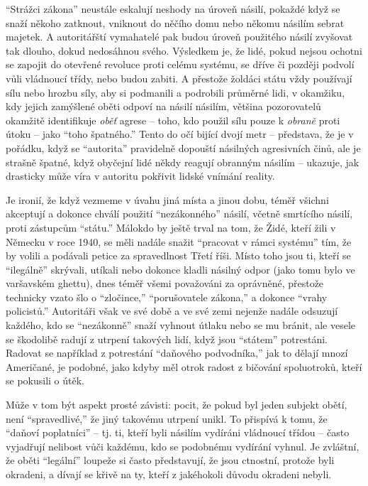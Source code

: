 \documentclass{book}
\begin{document}
\enquote{Strážci zákona} neustále eskalují neshody na úroveň násilí, pokaždé když se snaží někoho zatknout, vniknout do něčího domu nebo někomu násilím sebrat majetek. A autoritářští vymahatelé pak budou úroveň použitého násilí zvyšovat tak dlouho, dokud nedosáhnou svého. Výsledkem je, že lidé, pokud nejsou ochotni se zapojit do otevřené revoluce proti celému systému, se dříve či později podvolí vůli vládnoucí třídy, nebo budou zabiti. A přestože žoldáci státu vždy používají sílu nebo hrozbu síly, aby si podmanili a podrobili průměrné lidi, v okamžiku, kdy jejich zamýšlené oběti odpoví na násilí násilím, většina pozorovatelů okamžitě identifikuje \emph{oběť} agrese -- toho, kdo použil sílu pouze k \emph{obraně} proti útoku -- jako \enquote{toho špatného.} Tento do očí bijící dvojí metr -- představa, že je v pořádku, když se \enquote{autorita} pravidelně dopouští násilných agresivních činů, ale je strašně špatné, když obyčejní lidé někdy reagují obranným násilím -- ukazuje, jak drasticky může víra v autoritu pokřivit lidské vnímání reality.

Je ironií, že když vezmeme v úvahu jiná místa a jinou dobu, téměř všichni akceptují a dokonce chválí použití \enquote{nezákonného} násilí, včetně smrtícího násilí, proti zástupcům \enquote{státu.} Málokdo by ještě trval na tom, že Židé, kteří žili v Německu v roce 1940, se měli nadále snažit \enquote{pracovat v rámci systému} tím, že by volili a podávali petice za spravedlnost Třetí říši. Místo toho jsou ti, kteří se \enquote{ilegálně} skrývali, utíkali nebo dokonce kladli násilný odpor (jako tomu bylo ve varšavském ghettu), dnes téměř všemi považováni za oprávněné, přestože technicky vzato šlo o \enquote{zločince,} \enquote{porušovatele zákona,} a dokonce \enquote{vrahy policistů.} Autoritáři však ve své době a ve své zemi nejenže nadále odsuzují každého, kdo se \enquote{nezákonně} snaží vyhnout útlaku nebo se mu bránit, ale vesele se škodolibě radují z utrpení takových lidí, když jsou \enquote{státem} potrestáni. Radovat se například z potrestání \enquote{daňového podvodníka,} jak to dělají mnozí Američané, je podobné, jako kdyby měl otrok radost z bičování spoluotroků, kteří se pokusili o útěk.

Může v tom být aspekt prosté závisti: pocit, že pokud byl jeden subjekt obětí, není \enquote{spravedlivé,} že jiný takovému utrpení unikl. To přispívá k tomu, že \enquote{daňoví poplatníci} -- tj. ti, kteří byli násilím vydíráni vládnoucí třídou -- často vyjadřují nelibost vůči každému, kdo se podobnému vydírání vyhnul. Je zvláštní, že oběti \enquote{legální} loupeže si často představují, že jsou ctnostní, protože byli okradeni, a dívají se křivě na ty, kteří z jakéhokoli důvodu okradeni nebyli.
\end{document}
